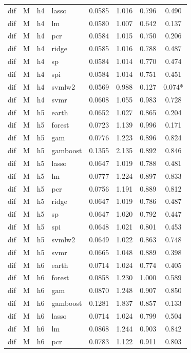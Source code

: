 \begin{ThreePartTable}
\begin{longtable}[t]{llclcccc}
dif & M & h4 & lasso & 0.0585 & 1.016 & 0.796 & 0.490\\
dif & M & h4 & lm & 0.0580 & 1.007 & 0.642 & 0.137\\
dif & M & h4 & pcr & 0.0584 & 1.015 & 0.750 & 0.206\\
dif & M & h4 & ridge & 0.0585 & 1.016 & 0.788 & 0.487\\
dif & M & h4 & sp & 0.0584 & 1.014 & 0.770 & 0.474\\
dif & M & h4 & spi & 0.0584 & 1.014 & 0.751 & 0.451\\
dif & M & h4 & svmlw2 & 0.0569 & 0.988 & 0.127 & 0.074*\\
dif & M & h4 & svmr & 0.0608 & 1.055 & 0.983 & 0.728\\
\addlinespace
dif & M & h5 & earth & 0.0652 & 1.027 & 0.865 & 0.204\\
dif & M & h5 & forest & 0.0723 & 1.139 & 0.996 & 0.171\\
dif & M & h5 & gam & 0.0776 & 1.223 & 0.896 & 0.824\\
dif & M & h5 & gamboost & 0.1355 & 2.135 & 0.892 & 0.846\\
dif & M & h5 & lasso & 0.0647 & 1.019 & 0.788 & 0.481\\
dif & M & h5 & lm & 0.0777 & 1.224 & 0.897 & 0.833\\
dif & M & h5 & pcr & 0.0756 & 1.191 & 0.889 & 0.812\\
dif & M & h5 & ridge & 0.0647 & 1.019 & 0.786 & 0.487\\
dif & M & h5 & sp & 0.0647 & 1.020 & 0.792 & 0.447\\
dif & M & h5 & spi & 0.0648 & 1.021 & 0.801 & 0.453\\
dif & M & h5 & svmlw2 & 0.0649 & 1.022 & 0.863 & 0.748\\
dif & M & h5 & svmr & 0.0665 & 1.048 & 0.889 & 0.398\\
\addlinespace
dif & M & h6 & earth & 0.0714 & 1.024 & 0.774 & 0.405\\
dif & M & h6 & forest & 0.0858 & 1.230 & 1.000 & 0.589\\
dif & M & h6 & gam & 0.0870 & 1.248 & 0.907 & 0.850\\
dif & M & h6 & gamboost & 0.1281 & 1.837 & 0.857 & 0.133\\
dif & M & h6 & lasso & 0.0714 & 1.024 & 0.799 & 0.504\\
dif & M & h6 & lm & 0.0868 & 1.244 & 0.903 & 0.842\\
dif & M & h6 & pcr & 0.0783 & 1.122 & 0.911 & 0.803\\

\end{longtable}
\end{ThreePartTable}

